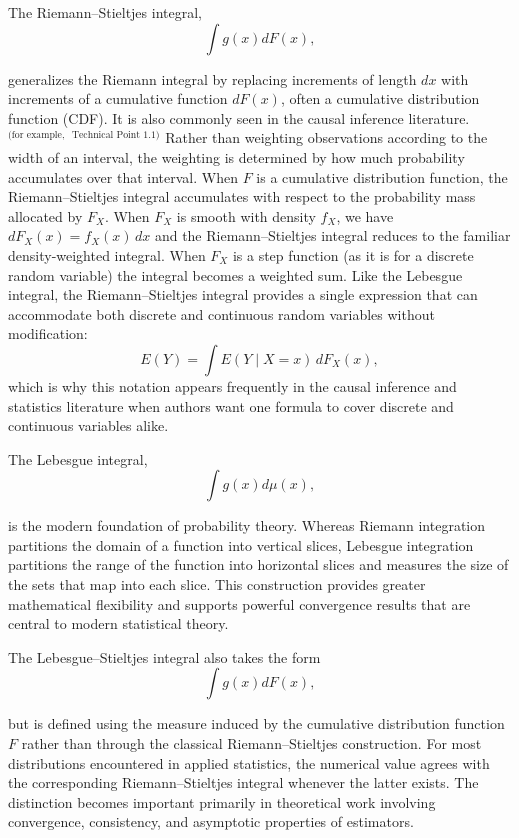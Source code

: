 \documentclass[12pt]{article}
\numberwithin{equation}{section}
\begin{document}

\noindent The Riemann--Stieltjes integral,
$$\int g(x)dF(x),$$

\noindent generalizes the Riemann integral by replacing increments of length $dx$ with increments of a cumulative function $dF(x)$, often a cumulative distribution function (CDF). It is also commonly seen in the causal inference literature.$^\text{(for example, }$\cite{Hernan2025}$^{\text{ Technical Point 1.1)}}$ Rather than weighting observations according to the width of an interval, the weighting is determined by how much probability accumulates over that interval. When $F$ is a cumulative distribution function, the Riemann--Stieltjes integral accumulates with respect to the probability mass allocated by $F_X$. When $F_X$ is smooth with density $f_X$, we have $dF_X(x) = f_X(x)\,dx$ and the Riemann--Stieltjes integral reduces to the familiar density-weighted integral. When $F_X$ is a step function (as it is for a discrete random variable) the integral becomes a weighted sum. Like the Lebesgue integral, the Riemann--Stieltjes integral provides a single expression that can accommodate both discrete and continuous random variables without modification:
\begin{equation}
E(Y) = \int E(Y\mid X=x)\,dF_X(x),
\end{equation}
which is why this notation appears frequently in the causal inference and statistics literature when authors want one formula to cover discrete and continuous variables alike.

The Lebesgue integral,
$$\int g(x)d\mu(x),$$

\noindent is the modern foundation of probability theory. Whereas Riemann integration partitions the domain of a function into vertical slices, Lebesgue integration partitions the range of the function into horizontal slices and measures the size of the sets that map into each slice. This construction provides greater mathematical flexibility and supports powerful convergence results that are central to modern statistical theory.

The Lebesgue--Stieltjes integral also takes the form
$$\int g(x)dF(x),$$

but is defined using the measure induced by the cumulative distribution function $F$ rather than through the classical Riemann--Stieltjes construction. For most distributions encountered in applied statistics, the numerical value agrees with the corresponding Riemann--Stieltjes integral whenever the latter exists. The distinction becomes important primarily in theoretical work involving convergence, consistency, and asymptotic properties of estimators.
\end{document}
